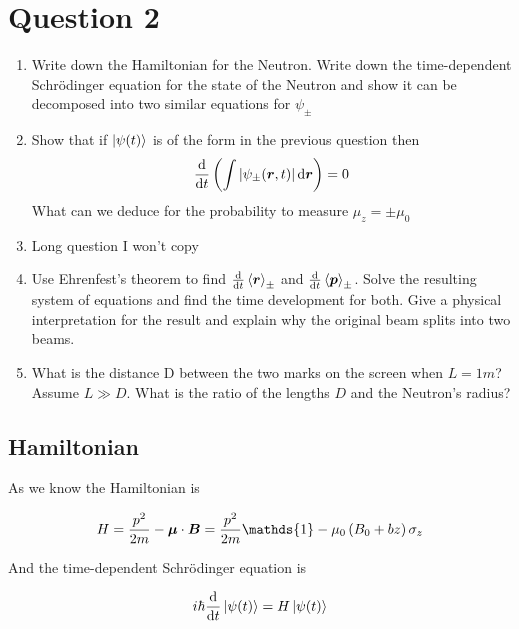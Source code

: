 \clearpage
\section{Question 2}

\begin{colbox}
	\begin{enumerate}
		\item Write down the Hamiltonian for the Neutron. Write down the time-dependent Schrödinger equation for the state of the Neutron and show it can be decomposed into two similar equations for $\psi_\pm$
		\item Show that if $\ket{\psi(t)}$ is of the form in the previous question then 
		\begin{equation*}
			\diff*{\ins{\int\left\lvert\psi_\pm(\vec r, t)\right\rvert\dd \vec r}}{t} = 0
		\end{equation*} What can we deduce for the probability to measure $\mu_z = \pm\mu_0$
		\item Long question I won't copy
		\item Use Ehrenfest's theorem to find $\diff*{\left\langle\vec r\right\rangle_\pm}{t}$ and $\diff*{\left\langle\vec p\right\rangle_\pm}{t}$. Solve the resulting system of equations and find the time development for both. Give a physical interpretation for the result and explain why the original beam splits into two beams.
		\item What is the distance D between the two marks on the screen when $L=1m$? Assume $L\gg D$. What is the ratio of the lengths $D$ and the Neutron's radius?
	\end{enumerate}
\end{colbox}

\subsection{Hamiltonian}

As we know the Hamiltonian is

\begin{equation}
	H = \frac{p^2}{2m}-\vec\mu\cdot\vec B = \frac{p^2}{2m}\mathds{1}-\mu_0\ins{B_0+bz}\sigma_z
\end{equation}

And the time-dependent Schrödinger equation is

\begin{equation}
	i\hbar \diff*{\ket{\psi(t)}}{t} = H\ket{\psi(t)}
\end{equation}

